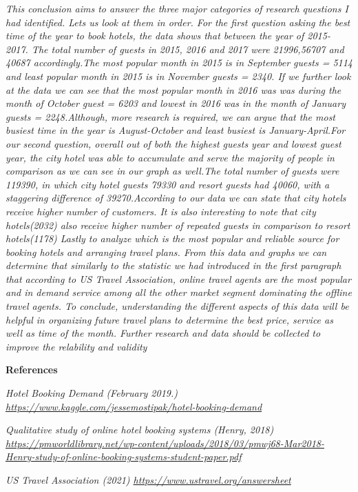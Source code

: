 \documentclass[
]{article}
\begin{document}
\emph{This conclusion aims to answer the three major categories of
research questions I had identified. Lets us look at them in order. For
the first question asking the best time of the year to book hotels, the
data shows that between the year of 2015-2017. The total number of
guests in 2015, 2016 and 2017 were 21996,56707 and 40687 accordingly.The
most popular month in 2015 is in September guests = 5114 and least
popular month in 2015 is in November guests = 2340. If we further look
at the data we can see that the most popular month in 2016 was was
during the month of October guest = 6203 and lowest in 2016 was in the
month of January guests = 2248.Although, more research is required, we
can argue that the most busiest time in the year is August-October and
least busiest is January-April.For our second question, overall out of
both the highest guests year and lowest guest year, the city hotel was
able to accumulate and serve the majority of people in comparison as we
can see in our graph as well.The total number of guests were 119390, in
which city hotel guests 79330 and resort guests had 40060, with a
staggering difference of 39270.According to our data we can state that
city hotels receive higher number of customers. It is also interesting
to note that city hotels(2032) also receive higher number of repeated
guests in comparison to resort hotels(1178) Lastly to analyze which is
the most popular and reliable source for booking hotels and arranging
travel plans. From this data and graphs we can determine that similarly
to the statistic we had introduced in the first paragraph that according
to US Travel Association, online travel agents are the most popular and
in demand service among all the other market segment dominating the
offline travel agents. To conclude, understanding the different aspects
of this data will be helpful in organizing future travel plans to
determine the best price, service as well as time of the month. Further
research and data should be collected to improve the relability and
validity}

\textbf{References}

\emph{Hotel Booking Demand (February 2019.)
\url{https://www.kaggle.com/jessemostipak/hotel-booking-demand}}

\emph{Qualitative study of online hotel booking systems (Henry, 2018)
\url{https://pmworldlibrary.net/wp-content/uploads/2018/03/pmwj68-Mar2018-Henry-study-of-online-booking-systems-student-paper.pdf}}

\emph{US Travel Association (2021)
\url{https://www.ustravel.org/answersheet} }
\end{document}
